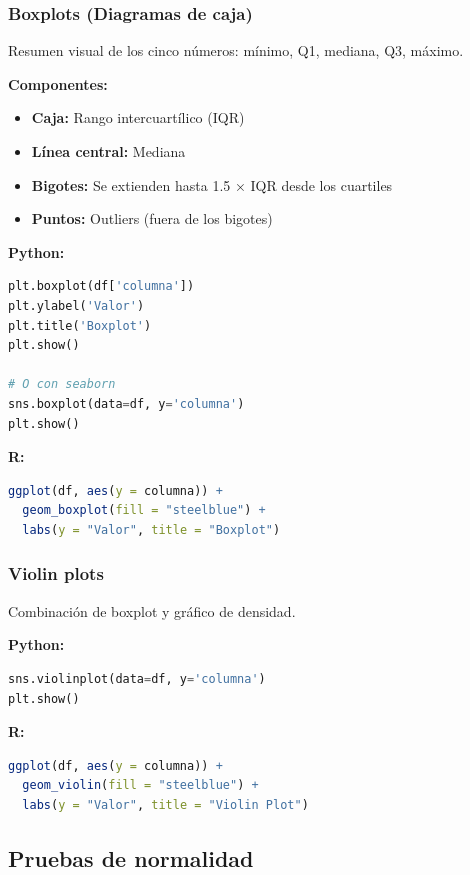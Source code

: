 \documentclass[a4paper,11pt]{article}
\begin{document}
\subsubsection{Boxplots (Diagramas de caja)}

Resumen visual de los cinco números: mínimo, Q1, mediana, Q3, máximo.

\textbf{Componentes:}
\begin{itemize}
    \item \textbf{Caja:} Rango intercuartílico (IQR)
    \item \textbf{Línea central:} Mediana
    \item \textbf{Bigotes:} Se extienden hasta 1.5 × IQR desde los cuartiles
    \item \textbf{Puntos:} Outliers (fuera de los bigotes)
\end{itemize}

\textbf{Python:}
\begin{lstlisting}[language=Python]
plt.boxplot(df['columna'])
plt.ylabel('Valor')
plt.title('Boxplot')
plt.show()

# O con seaborn
sns.boxplot(data=df, y='columna')
plt.show()
\end{lstlisting}

\textbf{R:}
\begin{lstlisting}[language=R]
ggplot(df, aes(y = columna)) +
  geom_boxplot(fill = "steelblue") +
  labs(y = "Valor", title = "Boxplot")
\end{lstlisting}

\subsubsection{Violin plots}

Combinación de boxplot y gráfico de densidad.

\textbf{Python:}
\begin{lstlisting}[language=Python]
sns.violinplot(data=df, y='columna')
plt.show()
\end{lstlisting}

\textbf{R:}
\begin{lstlisting}[language=R]
ggplot(df, aes(y = columna)) +
  geom_violin(fill = "steelblue") +
  labs(y = "Valor", title = "Violin Plot")
\end{lstlisting}

\subsection{Pruebas de normalidad}
\end{document}
